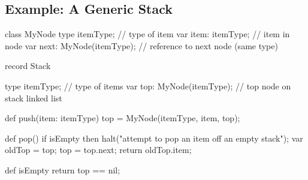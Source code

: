 \subsection{Example: A Generic Stack}
\label{Example_Generic_Stack}

\begin{chapel}
class MyNode {
  type itemType;              // type of item
  var item: itemType;         // item in node
  var next: MyNode(itemType); // reference to next node (same type)
}

record Stack {
  type itemType;             // type of items
  var top: MyNode(itemType); // top node on stack linked list

  def push(item: itemType) {
    top = MyNode(itemType, item, top);
  }

  def pop() {
    if isEmpty then
      halt("attempt to pop an item off an empty stack");
    var oldTop = top;
    top = top.next;
    return oldTop.item;
  }

  def isEmpty return top == nil;
}
\end{chapel}
